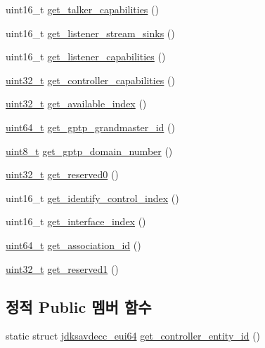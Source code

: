 \begin{DoxyCompactItemize}
\item 
uint16\+\_\+t \hyperlink{classavdecc__lib_1_1adp_a12f429501b8be7d1cc491f5d974014e1}{get\+\_\+talker\+\_\+capabilities} ()
\item 
uint16\+\_\+t \hyperlink{classavdecc__lib_1_1adp_ac286af88836247bc0a86542a819b67e1}{get\+\_\+listener\+\_\+stream\+\_\+sinks} ()
\item 
uint16\+\_\+t \hyperlink{classavdecc__lib_1_1adp_aaf4de47690094e87b18d74e6c9ece7d5}{get\+\_\+listener\+\_\+capabilities} ()
\item 
\hyperlink{parse_8c_a6eb1e68cc391dd753bc8ce896dbb8315}{uint32\+\_\+t} \hyperlink{classavdecc__lib_1_1adp_a38cba895bb53685e704eff10a8cac652}{get\+\_\+controller\+\_\+capabilities} ()
\item 
\hyperlink{parse_8c_a6eb1e68cc391dd753bc8ce896dbb8315}{uint32\+\_\+t} \hyperlink{classavdecc__lib_1_1adp_a733e0b48f3ef315f2b97da4070c8e335}{get\+\_\+available\+\_\+index} ()
\item 
\hyperlink{parse_8c_aec6fcb673ff035718c238c8c9d544c47}{uint64\+\_\+t} \hyperlink{classavdecc__lib_1_1adp_a4df3399e4a56e2c02a6a13b705cba69e}{get\+\_\+gptp\+\_\+grandmaster\+\_\+id} ()
\item 
\hyperlink{stdint_8h_aba7bc1797add20fe3efdf37ced1182c5}{uint8\+\_\+t} \hyperlink{classavdecc__lib_1_1adp_a26e16dbad038cad551469a9eabb636f6}{get\+\_\+gptp\+\_\+domain\+\_\+number} ()
\item 
\hyperlink{parse_8c_a6eb1e68cc391dd753bc8ce896dbb8315}{uint32\+\_\+t} \hyperlink{classavdecc__lib_1_1adp_a1c5ba29bd578f639e2e5a7cc56968365}{get\+\_\+reserved0} ()
\item 
uint16\+\_\+t \hyperlink{classavdecc__lib_1_1adp_a5066760097c3a34b8ef11ea4a2ba8612}{get\+\_\+identify\+\_\+control\+\_\+index} ()
\item 
uint16\+\_\+t \hyperlink{classavdecc__lib_1_1adp_ae92bedf2cb1d11e33e572e42dc82e378}{get\+\_\+interface\+\_\+index} ()
\item 
\hyperlink{parse_8c_aec6fcb673ff035718c238c8c9d544c47}{uint64\+\_\+t} \hyperlink{classavdecc__lib_1_1adp_abae736ca9c7ebb15316db8c900192b62}{get\+\_\+association\+\_\+id} ()
\item 
\hyperlink{parse_8c_a6eb1e68cc391dd753bc8ce896dbb8315}{uint32\+\_\+t} \hyperlink{classavdecc__lib_1_1adp_a34191808540b73ae167b6dff829e1587}{get\+\_\+reserved1} ()
\end{DoxyCompactItemize}
\subsection*{정적 Public 멤버 함수}
\begin{DoxyCompactItemize}
\item 
static struct \hyperlink{structjdksavdecc__eui64}{jdksavdecc\+\_\+eui64} \hyperlink{classavdecc__lib_1_1adp_a0c0959a46658c0a22e9530334b2912da}{get\+\_\+controller\+\_\+entity\+\_\+id} ()
\end{DoxyCompactItemize}
